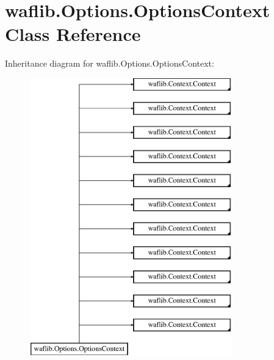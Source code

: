 \hypertarget{classwaflib_1_1_options_1_1_options_context}{}\section{waflib.\+Options.\+Options\+Context Class Reference}
\label{classwaflib_1_1_options_1_1_options_context}
Inheritance diagram for waflib.\+Options.\+Options\+Context\+:\begin{figure}[H]
\begin{center}
\leavevmode
\includegraphics[height=12.000000cm]{classwaflib_1_1_options_1_1_options_context}
\end{center}
\end{figure}
